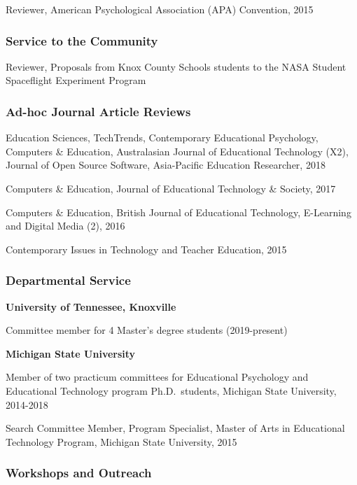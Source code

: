 \documentclass[]{article}
\begin{document}
Reviewer, American Psychological Association (APA) Convention, 2015

\subsubsection{Service to the Community}\label{service-to-the-community}

Reviewer, Proposals from Knox County Schools students to the NASA
Student Spaceflight Experiment Program

\subsubsection{Ad-hoc Journal Article
Reviews}\label{ad-hoc-journal-article-reviews}

Education Sciences, TechTrends, Contemporary Educational Psychology,
Computers \& Education, Australasian Journal of Educational Technology
(X2), Journal of Open Source Software, Asia-Pacific Education
Researcher, 2018

Computers \& Education, Journal of Educational Technology \& Society,
2017

Computers \& Education, British Journal of Educational Technology,
E-Learning and Digital Media (2), 2016

Contemporary Issues in Technology and Teacher Education, 2015

\subsubsection{Departmental Service}\label{departmental-service}

\textbf{University of Tennessee, Knoxville}

Committee member for 4 Master's degree students (2019-present)

\textbf{Michigan State University}

Member of two practicum committees for Educational Psychology and
Educational Technology program Ph.D.~students, Michigan State
University, 2014-2018

Search Committee Member, Program Specialist, Master of Arts in
Educational Technology Program, Michigan State University, 2015

\subsubsection{Workshops and Outreach}\label{workshops-and-outreach}
\end{document}
